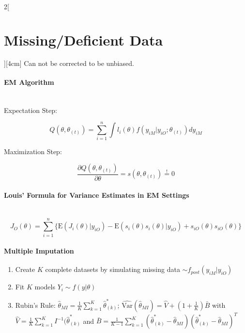 \documentclass[8pt]{extarticle}
\begin{document}
\begin{multicols}{2}[\section{Missing/Deficient Data}][4cm]
\noindent Can not be corrected to be unbiased.

\paragraph{EM Algorithm} \ \\

\noindent Expectation Step:

$$Q(\theta,\theta_{(t)}) = \sum_{i=1}^n\int l_i(\theta)f(y_{iM}|y_{iO};\theta_{(t)})dy_{iM}$$

\noindent Maximization Step:

$$\frac{\partial Q(\theta,\theta_{(t)})}{\partial \theta} = s(\theta,\theta_{(t)}) \overset{!}{=} 0 $$



\paragraph{Louis' Formula for Variance Estimates in EM Settings} \ \\

$$J_O(\theta) = \sum_{i=1}^n \{\mathrm{E}(J_i(\theta)|y_{iO}) - \mathrm{E}(s_i(\theta)s_i(\theta)|y_{iO}) + s_{iO}(\theta)s_{iO}(\theta)\}$$


 \paragraph{Multiple Imputation}
 
 \begin{enumerate}
 \item Create $K$ complete datasets by simulating missing data $\sim f_{post}(y_{iM}|y_{iO})$
 \item Fit $K$ models $Y_i \sim f(y|\theta)$
 \item Rubin's Rule: $\hat{\theta}_{MI} = \frac{1}{K}\sum_{k=1}^K \hat{\theta}^*_{(k)}$;
  $\widehat{\text{Var}}(\hat{\theta}_{MI}) = \hat{V} {+} (1{+}\frac{1}{K})\bar{B}$ 
 with $\hat{V} = \frac{1}{K} \sum_{k=1}^K I^{-1}(\hat{\theta}_{(k)}^*$ 
 and $\bar{B} = \frac{1}{K-1} \sum_{k=1}^K (\hat{\theta}_{(k)}^* - \hat{\theta}_{MI}) (\hat{\theta}_{(k)}^* - \hat{\theta}_{MI})^T$
 \end{enumerate}
 

\end{multicols}
\end{document}
